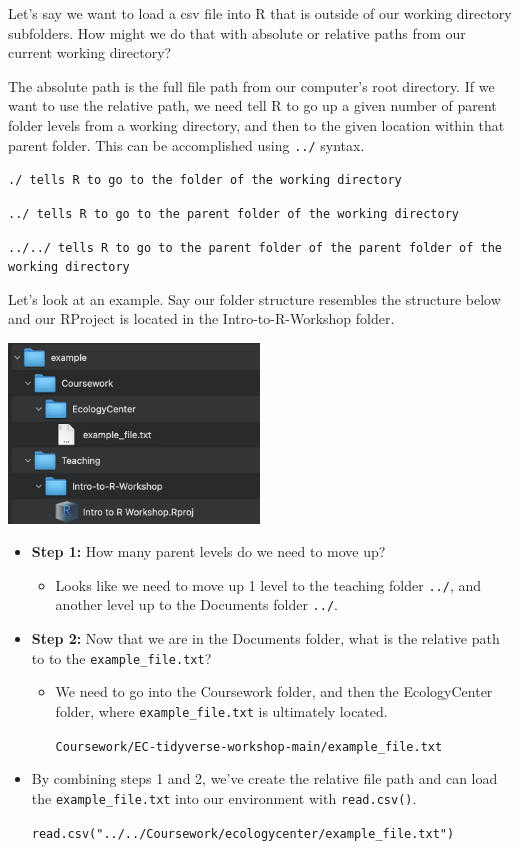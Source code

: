 \documentclass[
]{book}
\providecommand{\tightlist}{%
  \setlength{\itemsep}{0pt}\setlength{\parskip}{0pt}}
\begin{document}
Let's say we want to load a csv file into R that is outside of our working directory subfolders. How might we do that with absolute or relative paths from our current working directory?

The absolute path is the full file path from our computer's root directory. If we want to use the relative path, we need tell R to go up a given number of parent folder levels from a working directory, and then to the given location within that parent folder. This can be accomplished using \texttt{../} syntax.

\texttt{./\ tells\ R\ to\ go\ to\ the\ folder\ of\ the\ working\ directory}

\texttt{../\ tells\ R\ to\ go\ to\ the\ parent\ folder\ of\ the\ working\ directory}

\texttt{../../\ tells\ R\ to\ go\ to\ the\ parent\ folder\ of\ the\ parent\ folder\ of\ the\ working\ directory}

Let's look at an example. Say our folder structure resembles the structure below and our RProject is located in the Intro-to-R-Workshop folder.

\includegraphics[width=0.5\textwidth,height=\textheight]{./docs/files/folder_hierarchy.png}

\begin{itemize}
\item
  \textbf{Step 1:} How many parent levels do we need to move up?

  \begin{itemize}
  \tightlist
  \item
    Looks like we need to move up 1 level to the teaching folder \texttt{../}, and another level up to the Documents folder \texttt{../}.
  \end{itemize}
\item
  \textbf{Step 2:} Now that we are in the Documents folder, what is the relative path to to the \texttt{example\_file.txt}?

  \begin{itemize}
  \item
    We need to go into the Coursework folder, and then the EcologyCenter folder, where
    \texttt{example\_file.txt} is ultimately located.

    \texttt{Coursework/EC-tidyverse-workshop-main/example\_file.txt}
  \end{itemize}
\item
  By combining steps 1 and 2, we've create the relative file path and can load the \texttt{example\_file.txt} into our environment with \texttt{read.csv()}.

  \texttt{read.csv("../../Coursework/ecologycenter/example\_file.txt")}
\end{itemize}
\end{document}
